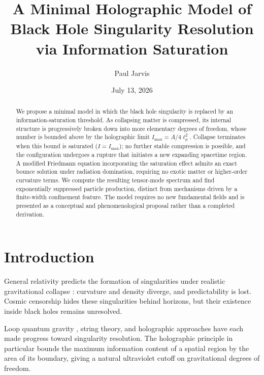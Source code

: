 \documentclass[onecolumn,PRD,amsmath,amssymb,aps,nofootinbib,superscriptaddress,11pt]{revtex4-2}
\begin{document}
\title{A Minimal Holographic Model of Black Hole Singularity Resolution\\via Information Saturation}

\author{Paul Jarvis}

\date{July 13, 2026}

\begin{abstract}
We propose a minimal model in which the black hole singularity is replaced by an information-saturation threshold. As collapsing matter is compressed, its internal structure is progressively broken down into more elementary degrees of freedom, whose number is bounded above by the holographic limit $I_{\max} = A/4\ell_p^2$. Collapse terminates when this bound is saturated ($I=I_{\max}$); no further stable compression is possible, and the configuration undergoes a rupture that initiates a new expanding spacetime region. A modified Friedmann equation incorporating the saturation effect admits an exact bounce solution under radiation domination, requiring no exotic matter or higher-order curvature terms. We compute the resulting tensor-mode spectrum and find exponentially suppressed particle production, distinct from mechanisms driven by a finite-width confinement feature. The model requires no new fundamental fields and is presented as a conceptual and phenomenological proposal rather than a completed derivation.
\end{abstract}

\maketitle
{}

\section{Introduction}
General relativity predicts the formation of singularities under realistic gravitational collapse \cite{Penrose1965, Hawking1970}: curvature and density diverge, and predictability is lost. Cosmic censorship hides these singularities behind horizons, but their existence inside black holes remains unresolved.

Loop quantum gravity \cite{Ashtekar2006}, string theory, and holographic approaches \cite{Hooft1993, Susskind1995} have each made progress toward singularity resolution. The holographic principle in particular bounds the maximum information content of a spatial region by the area of its boundary, giving a natural ultraviolet cutoff on gravitational degrees of freedom.
\end{document}
